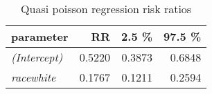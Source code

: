 \begin{wraptable}{r}{3in}

\caption{\label{tab:quasipoisson_reg_RR}Quasi poisson regression risk ratios}
\centering
\fontsize{9}{11}\selectfont
\begin{tabular}[t]{>{}lrrr}
\toprule
parameter & RR & 2.5 \% & 97.5 \%\\
\midrule
\em{(Intercept)} & 0.5220 & 0.3873 & 0.6848\\
\em{racewhite} & 0.1767 & 0.1211 & 0.2594\\
\bottomrule
\end{tabular}
\end{wraptable}

